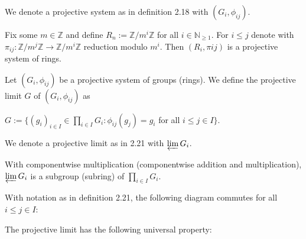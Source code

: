 \begin{notation}
We denote a projective system as in definition 2.18 with $(G_i, \phi_{ij})$.
\end{notation}

\begin{example}
Fix some $m \in \mathbb{Z}$ and define $R_n := \mathbb{Z} /m^i \mathbb{Z}$ for all $i \in \mathbb{N}_{\geq 1}$. For $ i \leq j$ denote with $\pi_{ij}: \mathbb{Z} /m^j \mathbb{Z} \rightarrow \mathbb{Z} /m^i \mathbb{Z}$ reduction modulo $m^i$. 
Then $(R_i, \pi{ij})$ is a projective system of rings.
\end{example}

\begin{definition}
Let  $(G_i, \phi_{ij})$ be a projective system of groups (rings). We define the projective limit $G$ of  $(G_i, \phi_{ij})$ as \newline
\begin{center}
$G := \{ (g_i)_{i \in I} \in \prod_{i \in I} G_i : \phi_{ij} (g_j) = g_i$ for all $i \leq j \in I \}$.
\end{center}
\end{definition}

\begin{notation}
We denote a projective limit as in 2.21 with $\varprojlim G_i$.
\end{notation}

\begin{remark}
With componentwise multiplication (componentwise addition and multiplication), $\varprojlim G_i$ is a subgroup (subring) of $\prod_{i \in I} G_i$.
\end{remark}

\begin{corollary}
With notation as in definition 2.21, the following diagram commutes for all $i \leq j \in I$: \newline
\begin{center}
\end{center}
\end{corollary}

The projective limit has the following universal property:

